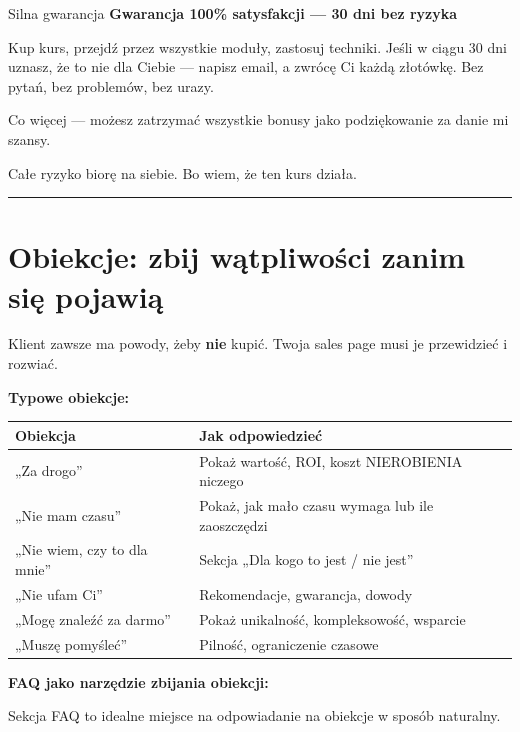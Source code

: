 \documentclass[
  12pt,
  a4paper,
  twoside,
  openright,
  12pt,
  DIV=12,
  BCOR=12mm]{scrbook}
\newcommand{\decoline}{%
  \begin{center}
    \textcolor{bordergray}{\rule{0.3\textwidth}{0.5pt}}
  \end{center}
}
\begin{document}
\begin{przyklad}{Silna gwarancja}
\textbf{Gwarancja 100\% satysfakcji --- 30 dni bez ryzyka}

Kup kurs, przejdź przez wszystkie moduły, zastosuj techniki. Jeśli w ciągu 30 dni uznasz, że to nie dla Ciebie --- napisz email, a zwrócę Ci każdą złotówkę. Bez pytań, bez problemów, bez urazy.

Co więcej --- możesz zatrzymać wszystkie bonusy jako podziękowanie za danie mi szansy.

Całe ryzyko biorę na siebie. Bo wiem, że ten kurs działa.
\end{przyklad}

\decoline

\section{Obiekcje: zbij wątpliwości zanim się
pojawią}\label{obiekcje-zbij-wux105tpliwoux15bci-zanim-siux119-pojawiux105}

Klient zawsze ma powody, żeby \textbf{nie} kupić. Twoja sales page musi
je przewidzieć i rozwiać.

\textbf{Typowe obiekcje:}

\begin{longtable}[]{@{}ll@{}}
\toprule\noalign{}
Obiekcja & Jak odpowiedzieć \\
\midrule\noalign{}
\endhead
\bottomrule\noalign{}
\endlastfoot
„Za drogo'' & Pokaż wartość, ROI, koszt NIEROBIENIA niczego \\
„Nie mam czasu'' & Pokaż, jak mało czasu wymaga lub ile zaoszczędzi \\
„Nie wiem, czy to dla mnie'' & Sekcja „Dla kogo to jest / nie jest'' \\
„Nie ufam Ci'' & Rekomendacje, gwarancja, dowody \\
„Mogę znaleźć za darmo'' & Pokaż unikalność, kompleksowość, wsparcie \\
„Muszę pomyśleć'' & Pilność, ograniczenie czasowe \\
\end{longtable}

\textbf{FAQ jako narzędzie zbijania obiekcji:}

Sekcja FAQ to idealne miejsce na odpowiadanie na obiekcje w sposób
naturalny.
\end{document}
